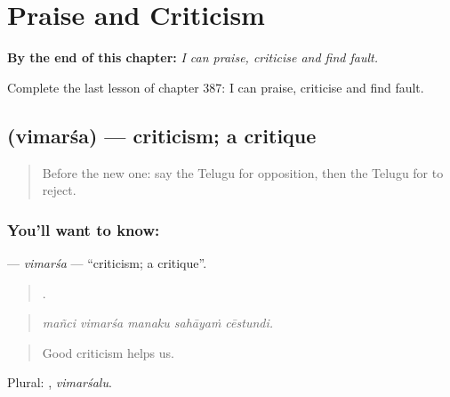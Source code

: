 
\chapter{Praise and Criticism}
\label{ch:te-praise-and-criticism}

\begin{chapteropening}
\textbf{By the end of this chapter:} \emph{I can praise, criticise and find fault.}

Complete the last lesson of chapter 387: I can praise, criticise and find fault.
\end{chapteropening}

\section[\texorpdfstring{\te{విమర్శ} (vimarśa)}{విమర్శ (vimarśa)}]{ (vimarśa) — criticism; a critique}

\label{lesson:TE-C387-vimarsa}



\begin{quote}
Before the new one: say the Telugu for opposition, then the Telugu for to reject.
\end{quote}

\subsection*{You'll want to know: }
\textbf{} — \emph{vimarśa} — \textquotedblleft{}criticism; a critique\textquotedblright{}.

\begin{quote}
    .
\end{quote}

\begin{quote}
\emph{mañci vimarśa manaku sahāyaṁ cēstundi.}
\end{quote}

\begin{quote}
Good criticism helps us.
\end{quote}

Plural: , \emph{vimarśalu}.

